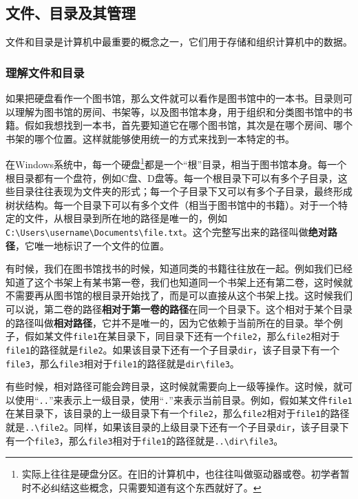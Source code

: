 \subsection{文件、目录及其管理}

文件和目录是计算机中最重要的概念之一，它们用于存储和组织计算机中的数据。

\subsubsection{理解文件和目录}

如果把硬盘看作一个图书馆，那么文件就可以看作是图书馆中的一本书。目录则可以理解为图书馆的房间、书架等，以及图书馆本身，用于组织和分类图书馆中的书籍。假如我想找到一本书，首先要知道它在哪个图书馆，其次是在哪个房间、哪个书架的哪个位置。这样就能够使用统一的方式来找到一本特定的书。

在Windows系统中，每一个硬盘\footnote{实际上往往是硬盘分区。在旧的计算机中，也往往叫做驱动器或卷。初学者暂时不必纠结这些概念，只需要知道有这个东西就好了。}都是一个“根”目录，相当于图书馆本身。每一个根目录都有一个盘符，例如C盘、D盘等。每一个根目录下可以有多个子目录，这些目录往往表现为文件夹的形式；每一个子目录下又可以有多个子目录，最终形成树状结构。每一个目录下可以有多个文件（相当于图书馆中的书籍）。对于一个特定的文件，从根目录到所在地的路径是唯一的，例如\texttt{C:\textbackslash Users\textbackslash username\textbackslash Documents\textbackslash file.txt}。这个完整写出来的路径叫做\textbf{绝对路径}，它唯一地标识了一个文件的位置。

有时候，我们在图书馆找书的时候，知道同类的书籍往往放在一起。例如我们已经知道了这个书架上有某书第一卷，我们也知道同一个书架上还有第二卷，这时候就不需要再从图书馆的根目录开始找了，而是可以直接从这个书架上找。这时候我们可以说，第二卷的路径\textbf{相对于第一卷的路径}在同一个目录下。这个相对于某个目录的路径叫做\textbf{相对路径}，它并不是唯一的，因为它依赖于当前所在的目录。举个例子，假如某文件\texttt{file1}在某目录下，同目录下还有一个\texttt{file2}，那么\texttt{file2}相对于\texttt{file1}的路径就是\texttt{file2}。如果该目录下还有一个子目录\texttt{dir}，该子目录下有一个\texttt{file3}，那么\texttt{file3}相对于\texttt{file1}的路径就是\texttt{dir\textbackslash file3}。

有些时候，相对路径可能会跨目录，这时候就需要向上一级等操作。这时候，就可以使用“\texttt{..}”来表示上一级目录，使用“\texttt{.}”来表示当前目录。例如，假如某文件\texttt{file1}在某目录下，该目录的上一级目录下有一个\texttt{file2}，那么\texttt{file2}相对于\texttt{file1}的路径就是\texttt{..\textbackslash file2}。同样，如果该目录的上级目录下还有一个子目录\texttt{dir}，该子目录下有一个\texttt{file3}，那么\texttt{file3}相对于\texttt{file1}的路径就是\texttt{..\textbackslash dir\textbackslash file3}。

